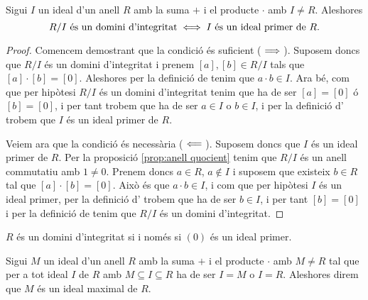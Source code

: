 \documentclass[../Apunts.tex]{subfiles}
\begin{document}
	\begin{proposition}
		\label{prop:R/I domini d'integritat sii I ideal primer}
		Sigui \(I\) un ideal d'un anell \(R\) amb la suma \(+\) i el producte \(\cdot\) amb \(I\neq R\). Aleshores
		\[R/I\text{ és un domini d'integritat}\iff I\text{ és un ideal primer de }R.\]
		\begin{proof}
			Comencem demostrant que la condició és suficient (\(\implies\)). Suposem doncs que \(R/I\) és un domini d'integritat i prenem \([a],[b]\in R/I\) tals que \([a]\cdot[b]=[0]\). Aleshores per la definició de  tenim que \(a\cdot b\in I\). Ara bé, com que per hipòtesi \(R/I\) és un domini d'integritat tenim que ha de ser \([a]=[0]\) ó \([b]=[0]\), i per tant trobem que ha de ser \(a\in I\) o \(b\in I\), i per la definició d' trobem que \(I\) és un ideal primer de \(R\).
			
			Veiem ara que la condició és necessària (\(\impliedby\)). Suposem doncs que \(I\) és un ideal primer de \(R\). Per la proposició \ref{prop:anell quocient} tenim que \(R/I\) és un anell commutatiu amb \(1\neq0\). Prenem doncs \(a\in R\), \(a\notin I\) i suposem que existeix \(b\in R\) tal que \([a]\cdot[b]=[0]\). Això és que \(a\cdot b\in I\), i com que per hipòtesi \(I\) és un ideal primer, per la definició d' trobem que ha de ser \(b\in I\), i per tant \([b]=[0]\) i per la definició de  tenim que \(R/I\) és un domini d'integritat.
		\end{proof}
	\end{proposition}
	\begin{corollary}
		\label{corollary:domini d'integritat sii (0) ideal primer}
		\(R\) és un domini d'integritat si i només si \((0)\) és un ideal primer.
	\end{corollary}
	\begin{definition}
		\label{def:ideal maximal}
		Sigui \(M\) un ideal d'un anell \(R\) amb la suma \(+\) i el producte \(\cdot\) amb \(M\neq R\) tal que  per a tot ideal \(I\) de \(R\) amb \(M\subseteq I\subseteq R\) ha de ser \(I=M\) o \(I=R\). Aleshores direm que \(M\) és un ideal maximal de \(R\).
	\end{definition}
\end{document}
